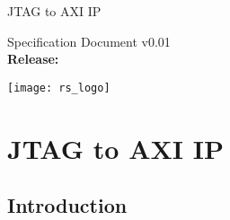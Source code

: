 \documentclass[fleqn,10pt]{SelfArx} %
\begin{document}
\begin{titlepage} %


	\fontsize{30pt}{40pt}\selectfont
	\noindent JTAG to AXI IP \\
	\vfill %
	
	\begin{multicols}{2}
		\raggedright%
		\fontsize{10pt}{20pt}\selectfont
		Specification Document v0.01 \\ \textbf{Release:} 

		\columnbreak
		\raggedleft %
		\texttt{[image: rs\_logo]}\\
	\end{multicols}
\end{titlepage}

\tableofcontents %


\newpage

\section{JTAG to AXI IP} %
\subsection{Introduction}
\vskip 1mm
\end{document}
